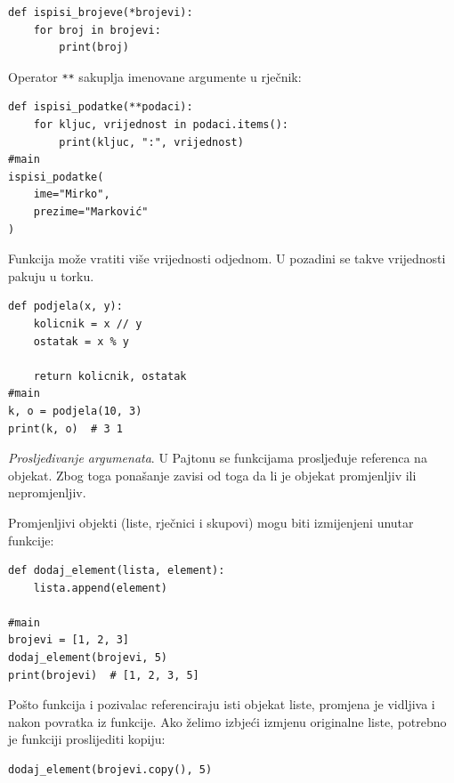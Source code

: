 \begin{verbatim}
def ispisi_brojeve(*brojevi):
    for broj in brojevi:
        print(broj)
\end{verbatim}

Operator \texttt{**} sakuplja imenovane argumente u rječnik:

\begin{verbatim}
def ispisi_podatke(**podaci):
    for kljuc, vrijednost in podaci.items():
        print(kljuc, ":", vrijednost)
#main
ispisi_podatke(
    ime="Mirko",
    prezime="Marković"
)
\end{verbatim}


Funkcija može vratiti više vrijednosti odjednom. U pozadini se takve vrijednosti pakuju u torku.

\begin{verbatim}
def podjela(x, y):
    kolicnik = x // y
    ostatak = x % y

    return kolicnik, ostatak
#main
k, o = podjela(10, 3)
print(k, o)  # 3 1
\end{verbatim}

\textit{Prosljeđivanje argumenata}.  U Pajtonu se funkcijama prosljeđuje referenca na objekat. Zbog toga ponašanje zavisi od toga da li je objekat promjenljiv ili nepromjenljiv.

Promjenljivi objekti (liste, rječnici i skupovi) mogu biti izmijenjeni unutar funkcije:

\begin{verbatim}
def dodaj_element(lista, element):
    lista.append(element)

#main
brojevi = [1, 2, 3]
dodaj_element(brojevi, 5)
print(brojevi)  # [1, 2, 3, 5]
\end{verbatim}

Pošto funkcija i pozivalac referenciraju isti objekat liste, promjena je vidljiva i nakon povratka iz funkcije. Ako želimo izbjeći izmjenu originalne liste, potrebno je funkciji proslijediti kopiju:

\begin{verbatim}
dodaj_element(brojevi.copy(), 5)
\end{verbatim}


